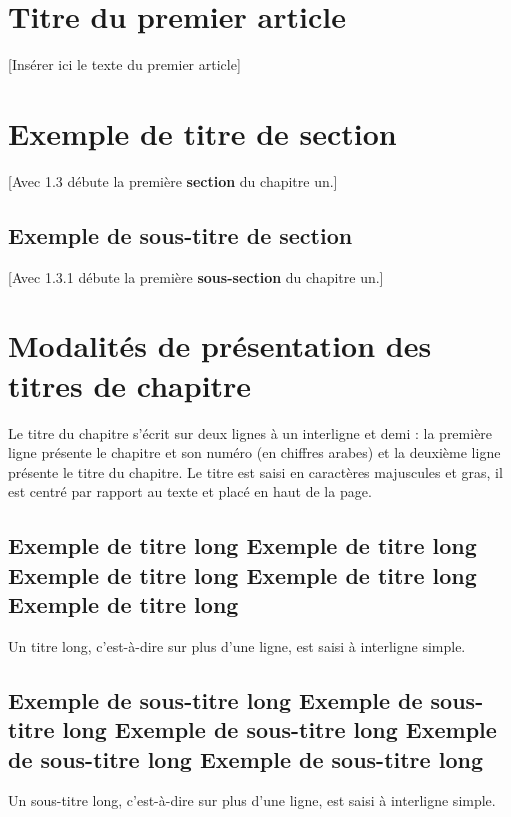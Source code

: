 \newpage

\section{Titre du premier article}

[Insérer ici le texte du premier article]

\section{Exemple de titre de section}

[Avec 1.3 débute la première \textbf{section} du chapitre un.]

\subsection{Exemple de sous-titre de section}

[Avec 1.3.1 débute la première \textbf{sous-section} du chapitre un.]

\section{Modalités de présentation des titres de chapitre}

Le titre du chapitre s’écrit sur deux lignes à un interligne et demi : la première ligne présente le chapitre et son numéro (en chiffres arabes) et la deuxième ligne présente le titre du chapitre. Le titre est saisi en caractères majuscules et gras, il est centré par rapport au texte et placé en haut de la page.

\begin{spacing}{1.0}
\section{Exemple de titre long Exemple de titre long Exemple de titre long Exemple de titre long Exemple de titre long}
\end{spacing}

Un titre long, c’est-à-dire sur plus d’une ligne, est saisi à interligne simple. %

\begin{spacing}{1.0}
\subsection{Exemple de sous-titre long Exemple de sous-titre long Exemple de sous-titre long Exemple de sous-titre long Exemple de sous-titre long}
\end{spacing}

Un sous-titre long, c’est-à-dire sur plus d’une ligne, est saisi à interligne simple. %